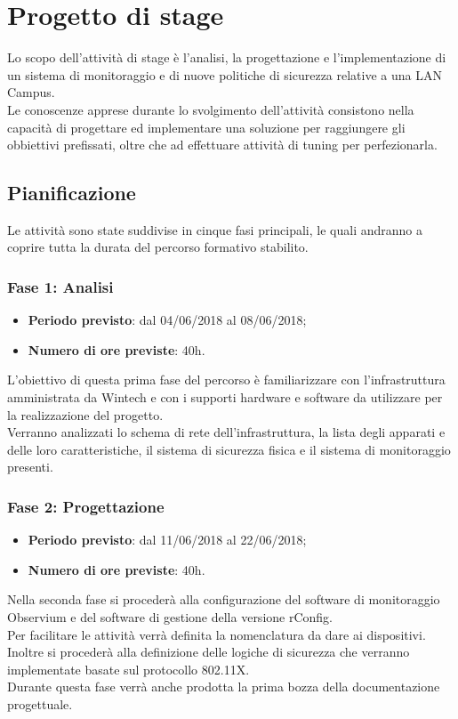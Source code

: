 \documentclass[Tesi.tex]{subfiles}
\begin{document}
\chapter{Progetto di stage}
Lo scopo dell'attività di stage è l’analisi, la progettazione e l'implementazione di un sistema di monitoraggio e di nuove politiche di sicurezza relative a una LAN Campus. \\
Le conoscenze apprese durante lo svolgimento dell'attività consistono nella capacità di progettare ed implementare una soluzione per raggiungere gli obbiettivi prefissati, oltre che ad effettuare attività di tuning per perfezionarla.


\section{Pianificazione}
Le attività sono state suddivise in cinque fasi principali, le quali andranno a coprire tutta la durata del percorso formativo stabilito.

\subsection{Fase 1: Analisi}
\begin{itemize}
	\item \textbf{Periodo previsto}: dal 04/06/2018 al 08/06/2018;
	\item \textbf{Numero di ore previste}: 40h.
\end{itemize}

L'obiettivo di questa prima fase del percorso è familiarizzare con l'infrastruttura amministrata da Wintech e con i supporti hardware e software da utilizzare per la realizzazione del progetto. \\
Verranno analizzati lo schema di rete dell'infrastruttura, la lista degli apparati e delle loro caratteristiche, il sistema di sicurezza fisica e il sistema di monitoraggio presenti. 

\subsection{Fase 2: Progettazione}
\begin{itemize}
	\item \textbf{Periodo previsto}: dal 11/06/2018 al 22/06/2018;
	\item \textbf{Numero di ore previste}: 40h.
\end{itemize}
	
Nella seconda fase si procederà alla configurazione del software di monitoraggio Observium e del software di gestione della versione rConfig. \\
Per facilitare le attività verrà definita la nomenclatura da dare ai dispositivi.\\
Inoltre si procederà alla definizione delle logiche di sicurezza che verranno implementate basate sul protocollo 802.11X. \\
Durante questa fase verrà anche prodotta la prima bozza della documentazione progettuale.
	
\end{document}
